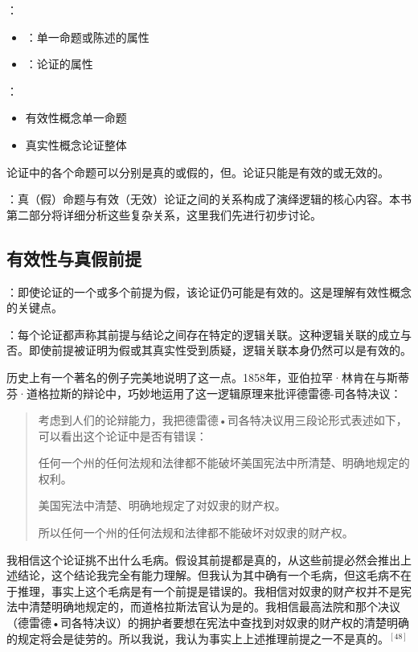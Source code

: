 \begin{theorembox}[title=真实性与有效性的根本区别]
：
\begin{itemize}
  \item {}：单一命题或陈述的属性
  \item {}：论证的属性
\end{itemize}

：
\begin{itemize}
  \item 有效性概念单一命题
  \item 真实性概念论证整体
\end{itemize}
\end{theorembox}

论证中的各个命题可以分别是真的或假的，但。论证只能是有效的或无效的。

：真（假）命题与有效（无效）论证之间的关系构成了演绎逻辑的核心内容。本书第二部分将详细分析这些复杂关系，这里我们先进行初步讨论。

\subsection{有效性与真假前提}

：即使论证的一个或多个前提为假，该论证仍可能是有效的。这是理解有效性概念的关键点。

：每个论证都声称其前提与结论之间存在特定的逻辑关联。这种逻辑关联的成立与否。即使前提被证明为假或其真实性受到质疑，逻辑关联本身仍然可以是有效的。

历史上有一个著名的例子完美地说明了这一点。1858年，亚伯拉罕·林肯在与斯蒂芬·道格拉斯的辩论中，巧妙地运用了这一逻辑原理来批评德雷德-司各特决议：

\begin{quotation}
考虑到人们的论辩能力，我把德雷德•司各特决议用三段论形式表述如下，可以看出这个论证中是否有错误：

任何一个州的任何法规和法律都不能破坏美国宪法中所清楚、明确地规定的权利。

美国宪法中清楚、明确地规定了对奴隶的财产权。

所以任何一个州的任何法规和法律都不能破坏对奴隶的财产权。
\end{quotation}

我相信这个论证挑不出什么毛病。假设其前提都是真的，从这些前提必然会推出上述结论，这个结论我完全有能力理解。但我认为其中确有一个毛病，但这毛病不在于推理，事实上这个毛病是有一个前提是错误的。我相信对奴隶的财产权并不是宪法中清楚明确地规定的，而道格拉斯法官认为是的。我相信最高法院和那个决议（德雷德•司各特决议）的拥护者要想在宪法中查找到对奴隶的财产权的清楚明确的规定将会是徒劳的。所以我说，我认为事实上上述推理前提之一不是真的。$^{[48]}$

